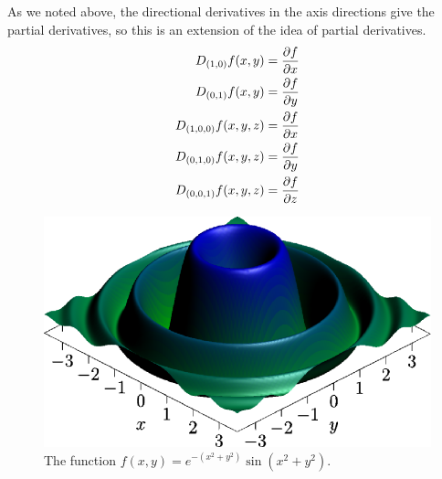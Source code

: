 \documentclass[fleqn,letterpaper]{report}
\begin{document}
As we noted above, the directional derivatives in the axis
directions give the partial derivatives, so this is an
extension of the idea of partial derivatives. 
\begin{align*}
D_{(1,0)} f(x,y) & = \frac{\partial f}{\partial x} \\
D_{(0,1)} f(x,y) & = \frac{\partial f}{\partial y} \\
D_{(1,0,0)} f(x,y,z) & = \frac{\partial f}{\partial x} \\
D_{(0,1,0)} f(x,y,z) & = \frac{\partial f}{\partial y} \\
D_{(0,0,1)} f(x,y,z) & = \frac{\partial f}{\partial z} 
\end{align*}

\begin{figure}[t]
\centering
\includegraphics[width=12cm]{figure41.eps}
\caption{The function $f(x,y) = e^{-(x^2+y^2)}\sin (x^2 + y^2)$.}
\label{figure-3d-graph4}
\end{figure}
\end{document}
